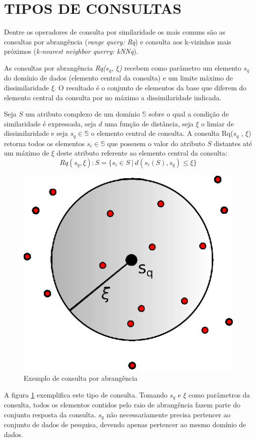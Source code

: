 \section{TIPOS DE CONSULTAS}
\label{sec:tiposconsultas}

Dentre os operadores de consulta por similaridade os mais comuns são as consultas por abrangência (\textit{range query: Rq}) e consulta aos k-vizinhos mais próximos (\textit{k-nearest neighbor querry: kNNq}).\par 

As consultas por abrangência \textit{Rq($s_q$, $\xi$)} recebem como parâmetro um elemento $s_q$ do domínio de dados (elemento central da consulta) e um limite máximo de dissimilaridade $\xi$. O resultado é o conjunto de 
elementos da base que diferem do elemento central da consulta por no máximo a dissimilaridade indicada.\par
\begin{mydef}
 \label{def:def_rq}
  Seja $S$ um atributo complexo de um domínio $\mathbb{S}$ sobre o qual a condição de similaridade é expressada, seja $d$ uma
  função de distância, seja $\xi$ o limiar de dissimilaridade e seja $s_q \in \mathbb{S}$ o elemento central de consulta. 
  A consulta Rq($s_q$ , $\xi$) retorna todos os elementos $s_i \in \mathbb{S}$ que possuem o valor do atributo $S$ distantes
  até um máximo de $\xi$ deste atributo referente ao elemento central da consulta: 
  \begin{equation} \label{eq:knnq}   
    Rq(s_q, \xi): S = \{s_i \in S \ |\ d(s_i(S), s_q) \leq \xi\}
  \end{equation}
\end{mydef}

\begin{figure}[H]
\centering
\includegraphics[width=.3\textwidth]{dados/figuras/rqu.eps}
\caption{Exemplo de consulta por abrangência}
\label{fig:exemplorq}
\end{figure}

A figura \ref{fig:exemplorq} exemplifica este tipo de consulta. Tomando $s_q$ e $\xi$ como parâmetros da consulta, todos os
elementos contidos pelo raio de abrangência fazem parte do conjunto resposta da consulta. $s_q$ não necessariamente precisa
pertencer ao conjunto de dados de pesquisa, devendo apenas pertencer ao mesmo domínio de dados.


